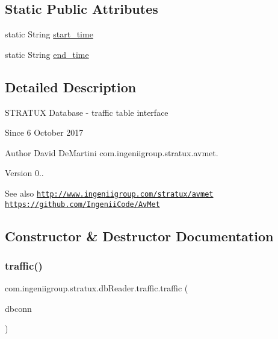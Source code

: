 \subsection*{Static Public Attributes}
\begin{DoxyCompactItemize}
\item 
static String \hyperlink{classcom_1_1ingeniigroup_1_1stratux_1_1db_reader_1_1traffic_ad47f5610906ba3d470324a5a41a8d7b0}{start\+\_\+time}
\item 
static String \hyperlink{classcom_1_1ingeniigroup_1_1stratux_1_1db_reader_1_1traffic_a441e8ac57ead230dc826d74bcc935032}{end\+\_\+time}
\end{DoxyCompactItemize}


\subsection{Detailed Description}
S\+T\+R\+A\+T\+UX Database -\/ traffic table interface

\begin{DoxySince}{Since}
6 October 2017 
\end{DoxySince}
\begin{DoxyAuthor}{Author}
David De\+Martini  com.\+ingeniigroup.\+stratux.\+avmet. 
\end{DoxyAuthor}
\begin{DoxyVersion}{Version}
0.. 
\end{DoxyVersion}
\begin{DoxySeeAlso}{See also}
\href{http://www.ingeniigroup.com/stratux/avmet}{\tt http\+://www.\+ingeniigroup.\+com/stratux/avmet}  \href{https://github.com/IngeniiCode/AvMet}{\tt https\+://github.\+com/\+Ingenii\+Code/\+Av\+Met} 
\end{DoxySeeAlso}


\subsection{Constructor \& Destructor Documentation}
\mbox{\label{classcom_1_1ingeniigroup_1_1stratux_1_1db_reader_1_1traffic_aa4c163ca10b3c2aff7230ff2ba7c21ce}} 
\subsubsection{\texorpdfstring{traffic()}{traffic()}}
{\footnotesize\ttfamily com.\+ingeniigroup.\+stratux.\+db\+Reader.\+traffic.\+traffic (\begin{DoxyParamCaption}\item[{\hyperlink{classcom_1_1ingeniigroup_1_1stratux_1_1db_connect_1_1_stratux_d_b}{Stratux\+DB}}]{dbconn }\end{DoxyParamCaption})}

